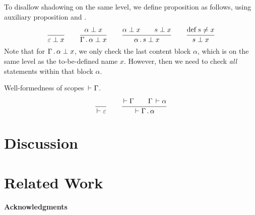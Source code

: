 \documentclass{article}
\theoremstyle{definition}
\theoremstyle{plain}
\theoremstyle{remark}
\begin{document}
To disallow shadowing on the same level, we define proposition
 as follows, using auxiliary proposition
 and
.
\begin{gather*}
  \ru{}{\NoClash \Ge x}
\qquad
  \ru{\NoClash \alpha x
    }{\NoClash {\Gamma \sep \alpha} x}
\qquad
  \ru{\NoClash \alpha x \qquad \NoClash s x
    }{\NoClash {\alpha \sep s} x}
\qquad
  \ru{\defined s \not= x
    }{\NoClash s x}
\end{gather*}
Note that for $\Gamma \,.\, \alpha \perp x$,
we only check the last content block $\alpha$,
which is on the same level as the to-be-defined name $x$.
However, then we need to check \emph{all} statements within that block
$\alpha$.

Well-formedness of scopes $\,\vdash\Gamma$.
\begin{gather*}
  \ru{}{\WScope \Ge}
\qquad
  \ru{\WScope \Gamma \qquad \WContent \Gamma \alpha
    }{\WScope {\Gamma \sep \alpha}}
\end{gather*}

\section{Discussion}

\section{Related Work}

\paragraph*{Acknowledgments}



\end{document}
